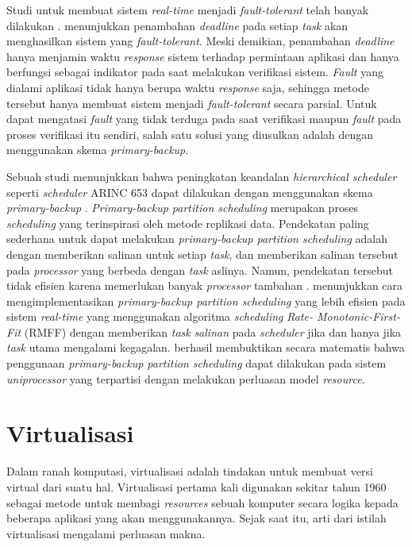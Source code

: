 Studi untuk membuat sistem \textit{real-time} menjadi \textit{fault-tolerant} telah banyak
dilakukan \citep{Campbell1986} \citep{Bertossi2006}. \citet{Campbell1986} menunjukkan penambahan
\textit{deadline} pada setiap \textit{task} akan menghasilkan sistem yang
\textit{fault-tolerant}.  Meski demikian, penambahan \textit{deadline} hanya menjamin waktu
\textit{response} sistem terhadap permintaan aplikasi dan hanya berfungsi sebagai indikator pada
saat melakukan verifikasi sistem.  \textit{Fault} yang dialami aplikasi tidak hanya berupa waktu
\textit{response} saja, sehingga metode tersebut hanya membuat sistem menjadi
\textit{fault-tolerant} secara parsial.  Untuk dapat mengatasi \textit{fault} yang tidak terduga
pada saat verifikasi maupun \textit{fault} pada proses verifikasi itu sendiri, salah satu solusi
yang diusulkan adalah dengan menggunakan skema \textit{primary-backup}.

Sebuah studi menunjukkan bahwa peningkatan keandalan \textit{hierarchical scheduler} seperti
\textit{scheduler} ARINC 653 dapat dilakukan dengan menggunakan skema \textit{primary-backup}
\citep{Hyun2012}. \textit{Primary-backup partition scheduling} merupakan proses
\textit{scheduling} yang terinspirasi oleh metode replikasi data. Pendekatan paling sederhana
untuk dapat melakukan \textit{primary-backup partition scheduling} adalah dengan memberikan
salinan untuk setiap \textit{task}, dan memberikan salinan tersebut pada \textit{processor} yang
berbeda dengan \textit{task} aslinya.  Namun, pendekatan tersebut tidak efisien karena
memerlukan banyak \textit{processor} tambahan \citep{Oh1994}.  \citet{Bertossi2006} menunjukkan
cara mengimplementasikan \textit{primary-backup partition scheduling} yang lebih efisien pada
sistem \textit{real-time} yang menggunakan algoritma \textit{scheduling} \textit{Rate-
Monotonic-First-Fit} (RMFF) dengan memberikan \textit{task} \textit{salinan} pada
\textit{scheduler} jika dan hanya jika \textit{task} utama mengalami kegagalan.  \citet{Jin2013}
berhasil membuktikan secara matematis bahwa penggunaan \textit{primary-backup partition
scheduling} dapat dilakukan pada sistem \textit{uniprocessor} yang terpartisi dengan melakukan
perluasan model \textit{resource}.

\section{Virtualisasi}

Dalam ranah komputasi, virtualisasi adalah tindakan untuk membuat versi virtual dari suatu hal.
Virtualisasi pertama kali digunakan sekitar tahun 1960 sebagai metode untuk membagi
\textit{resources} sebuah komputer secara logika kepada beberapa aplikasi yang akan
menggunakannya.  Sejak saat itu, arti dari istilah virtualisasi mengalami perluasan makna.

